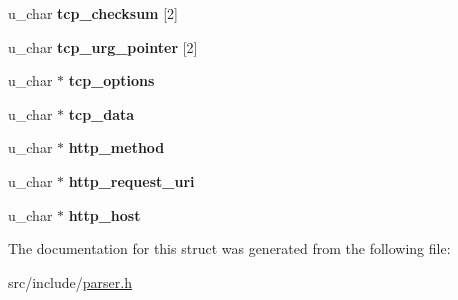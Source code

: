 \begin{DoxyCompactItemize}
\item 
\hypertarget{structframe_aa59fe9e426c53f8ebf16ac6e41acc6d7}{}u\+\_\+char {\bfseries tcp\+\_\+checksum} \mbox{[}2\mbox{]}\label{structframe_aa59fe9e426c53f8ebf16ac6e41acc6d7}

\item 
\hypertarget{structframe_ab25071300b8ae649d6424dfd36192237}{}u\+\_\+char {\bfseries tcp\+\_\+urg\+\_\+pointer} \mbox{[}2\mbox{]}\label{structframe_ab25071300b8ae649d6424dfd36192237}

\item 
\hypertarget{structframe_a44559d1880f1c465b954ac0fe68c42c8}{}u\+\_\+char $\ast$ {\bfseries tcp\+\_\+options}\label{structframe_a44559d1880f1c465b954ac0fe68c42c8}

\item 
\hypertarget{structframe_acd06a4e764a5ee82b562dd87fcfca7ae}{}u\+\_\+char $\ast$ {\bfseries tcp\+\_\+data}\label{structframe_acd06a4e764a5ee82b562dd87fcfca7ae}

\item 
\hypertarget{structframe_aa3c7250abde611f15ad948b925e21e46}{}u\+\_\+char $\ast$ {\bfseries http\+\_\+method}\label{structframe_aa3c7250abde611f15ad948b925e21e46}

\item 
\hypertarget{structframe_a3a19950676be73e836c7e368fb03d404}{}u\+\_\+char $\ast$ {\bfseries http\+\_\+request\+\_\+uri}\label{structframe_a3a19950676be73e836c7e368fb03d404}

\item 
\hypertarget{structframe_a24c72cc7e124455fa485328cd43f7139}{}u\+\_\+char $\ast$ {\bfseries http\+\_\+host}\label{structframe_a24c72cc7e124455fa485328cd43f7139}

\end{DoxyCompactItemize}


The documentation for this struct was generated from the following file\+:\begin{DoxyCompactItemize}
\item 
src/include/\hyperlink{parser_8h}{parser.\+h}\end{DoxyCompactItemize}
